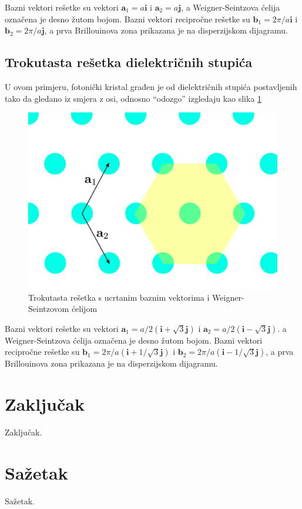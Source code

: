 \documentclass[utf8, seminar]{fer}
\begin{document}
Bazni vektori rešetke su vektori ${\mathbf{a}_1 = a \mathbf{i}}$ i
${\mathbf{a}_2= a \mathbf{j}}$, a Weigner-Seintzova ćelija označena je
desno žutom bojom. Bazni vektori recipročne rešetke su
${\mathbf{b}_1 = 2 \pi/a \mathbf{i}}$ i
${\mathbf{b}_2 = 2 \pi/a \mathbf{j}}$, a prva Brillouinova zona prikazana
je na disperzijskom dijagramu.


\section{Trokutasta rešetka dielektričnih stupića}

U ovom primjeru, fotonički kristal građen je od dielektričnih stupića
postavljenih tako da gledano iz smjera z osi, odnosno ``odozgo'' izgledaju kao
slika \ref{fig:triangular_lattice}

\begin{figure}[h]
	\centering
	\includegraphics[width = 1.0\linewidth]{./images/triangular_lattice.pdf}
	\caption{Trokutasta rešetka s ucrtanim baznim vektorima i Weigner-Seintzovom
	ćelijom}
	\label{fig:triangular_lattice}
\end{figure}

Bazni vektori rešetke su vektori
${\mathbf{a}_1 = a/2 (\mathbf{i} + \sqrt{3} \mathbf{j})}$ i
${\mathbf{a}_2 = a/2 (\mathbf{i} - \sqrt{3} \mathbf{j})}$.
a Weigner-Seintzova ćelija označena je desno žutom bojom.
Bazni vektori recipročne rešetke su
${\mathbf{b}_1 = 2 \pi/a( \mathbf{i} + 1/\sqrt{3} \mathbf{j})}$ i
${\mathbf{b}_2 = 2 \pi/a( \mathbf{i} - 1/\sqrt{3} \mathbf{j})}$,
a prva Brillouinova zona prikazana je na disperzijskom dijagramu.

\chapter{Zaključak}
Zaključak.




\chapter{Sažetak}
Sažetak.
\end{document}
